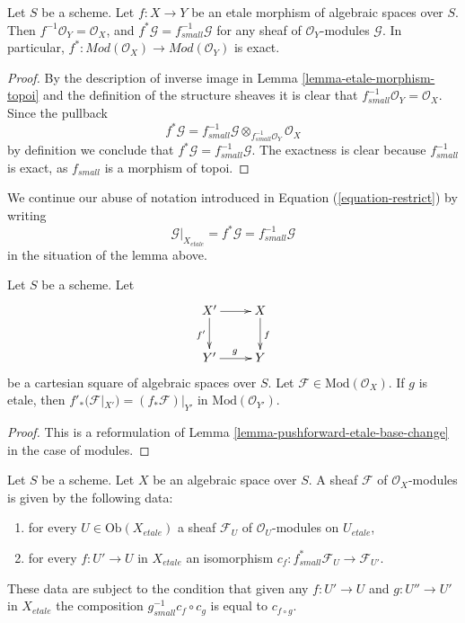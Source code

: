 \begin{lemma}
\label{lemma-etale-exact-pullback}
Let $S$ be a scheme.
Let $f : X \to Y$ be an etale morphism of algebraic spaces over $S$.
Then $f^{-1}\mathcal{O}_Y = \mathcal{O}_X$, and
$f^*\mathcal{G} = f_{small}^{-1}\mathcal{G}$ for any sheaf of
$\mathcal{O}_Y$-modules $\mathcal{G}$. In particular,
$f^* : \textit{Mod}(\mathcal{O}_X) \to \textit{Mod}(\mathcal{O}_Y)$
is exact.
\end{lemma}

\begin{proof}
By the description of inverse image in Lemma \ref{lemma-etale-morphism-topoi}
and the definition of the structure sheaves it is clear that
$f_{small}^{-1}\mathcal{O}_Y = \mathcal{O}_X$. Since the pullback
$$
f^*\mathcal{G} =
f_{small}^{-1}\mathcal{G} \otimes_{f_{small}^{-1}\mathcal{O}_Y}
\mathcal{O}_X
$$
by definition we conclude that $f^*\mathcal{G} = f_{small}^{-1}\mathcal{G}$.
The exactness is clear because $f_{small}^{-1}$ is exact, as $f_{small}$
is a morphism of topoi.
\end{proof}

\noindent
We continue our abuse of notation introduced in
Equation (\ref{equation-restrict})
by writing
\begin{equation}
\label{equation-restrict-modules}
\mathcal{G}|_{X_{etale}}
= f^*\mathcal{G}
= f_{small}^{-1}\mathcal{G}
\end{equation}
in the situation of the lemma above.

\begin{lemma}
\label{lemma-pushforward-etale-base-change-modules}
Let $S$ be a scheme. Let
$$
\xymatrix{
X' \ar[r] \ar[d]_{f'} & X \ar[d]^f \\
Y' \ar[r]^g & Y
}
$$
be a cartesian square of algebraic spaces over $S$. Let
$\mathcal{F} \in \text{Mod}(\mathcal{O}_X)$. If $g$ is etale, then
$f'_*(\mathcal{F}|_{X'}) = (f_*\mathcal{F})|_{Y'}$ in
$\text{Mod}(\mathcal{O}_{Y'})$.
\end{lemma}

\begin{proof}
This is a reformulation of
Lemma \ref{lemma-pushforward-etale-base-change}
in the case of modules.
\end{proof}

\begin{lemma}
\label{lemma-characterize-module-small-etale}
Let $S$ be a scheme. Let $X$ be an algebraic space over $S$.
A sheaf $\mathcal{F}$ of $\mathcal{O}_X$-modules is given by the following
data:
\begin{enumerate}
\item for every $U \in \text{Ob}(X_{etale})$ a sheaf
$\mathcal{F}_U$ of $\mathcal{O}_U$-modules on $U_{etale}$,
\item for every $f : U' \to U$ in $X_{etale}$ an isomorphism
$c_f : f_{small}^*\mathcal{F}_U \to \mathcal{F}_{U'}$.
\end{enumerate}
These data are subject to the condition that given any $f : U' \to U$
and $g : U'' \to U'$ in $X_{etale}$ the composition
$g_{small}^{-1}c_f \circ c_g$ is equal to $c_{f \circ g}$.
\end{lemma}

